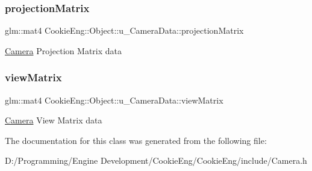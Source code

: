 \subsubsection{\texorpdfstring{projection\+Matrix}{projectionMatrix}}
{\footnotesize\ttfamily glm\+::mat4 Cookie\+Eng\+::\+Object\+::u\+\_\+\+Camera\+Data\+::projection\+Matrix}

\hyperlink{class_cookie_eng_1_1_object_1_1_camera}{Camera} Projection Matrix data \mbox{\label{struct_cookie_eng_1_1_object_1_1u___camera_data_a1b1b0afdb4ac8c07474be855341516e4}} 
\subsubsection{\texorpdfstring{view\+Matrix}{viewMatrix}}
{\footnotesize\ttfamily glm\+::mat4 Cookie\+Eng\+::\+Object\+::u\+\_\+\+Camera\+Data\+::view\+Matrix}

\hyperlink{class_cookie_eng_1_1_object_1_1_camera}{Camera} View Matrix data 

The documentation for this class was generated from the following file\+:\begin{DoxyCompactItemize}
\item 
D\+:/\+Programming/\+Engine Development/\+Cookie\+Eng/\+Cookie\+Eng/include/Camera.\+h\end{DoxyCompactItemize}
